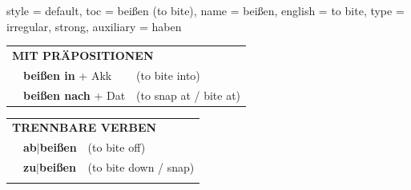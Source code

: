 \begin{verbentry}{
  style = {default},
  toc = {beißen (to bite)},
  name = {beißen},
  english = {to bite},
  type = {irregular, strong},
  auxiliary = {haben}
}
   \vspace{10pt}

   \begin{tabular}{lll}
      \multicolumn{3}{l}{\textbf{MIT PRÄPOSITIONEN}}\\
& \textbf{beißen in} + Akk & (to bite into)\\
& \textbf{beißen nach} + Dat & (to snap at / bite at)\\
\end{tabular}
  \hfill
   \begin{tabular}{lll}
      \multicolumn{3}{l}{\textbf{TRENNBARE VERBEN}}\\
 & \textbf{ab$|$beißen} & (to bite off)\\
 & \textbf{zu$|$beißen} & (to bite down / snap)\\
\vspace{10pt}
  \end{tabular}

  \vspace{-5pt}
\end{verbentry}

